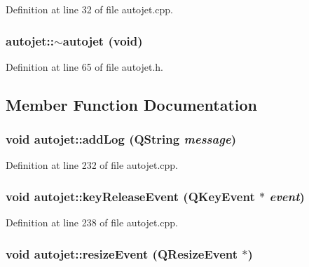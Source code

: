 Definition at line 32 of file autojet.cpp.\hypertarget{classautojet_7212daec39a5deac5eb4fb4588a35455}{
\subsubsection[{$\sim$autojet}]{\setlength{\rightskip}{0pt plus 5cm}autojet::$\sim$autojet (void)}}
\label{classautojet_7212daec39a5deac5eb4fb4588a35455}




Definition at line 65 of file autojet.h.

\subsection{Member Function Documentation}
\hypertarget{classautojet_640ed2fd0823498ed55c79127564d860}{
\subsubsection[{addLog}]{\setlength{\rightskip}{0pt plus 5cm}void autojet::addLog (QString {\em message})}}
\label{classautojet_640ed2fd0823498ed55c79127564d860}




Definition at line 232 of file autojet.cpp.\hypertarget{classautojet_04fa5ae957fcba538b0ff39e46a5642b}{
\subsubsection[{keyReleaseEvent}]{\setlength{\rightskip}{0pt plus 5cm}void autojet::keyReleaseEvent (QKeyEvent $\ast$ {\em event})}}
\label{classautojet_04fa5ae957fcba538b0ff39e46a5642b}




Definition at line 238 of file autojet.cpp.\hypertarget{classautojet_7114cf8399871627b93ebcf6c6ef9f95}{
\subsubsection[{resizeEvent}]{\setlength{\rightskip}{0pt plus 5cm}void autojet::resizeEvent (QResizeEvent $\ast$)}}
\label{classautojet_7114cf8399871627b93ebcf6c6ef9f95}




